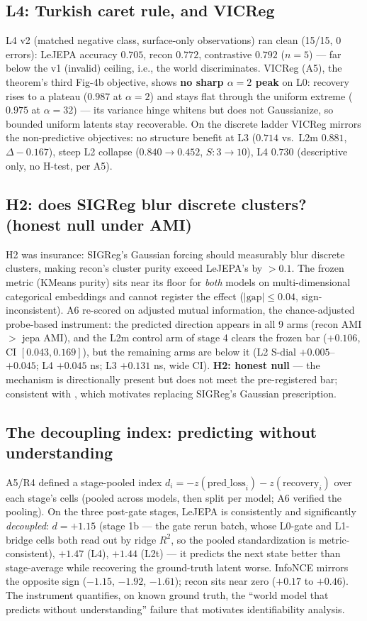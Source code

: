 \documentclass[11pt]{article}
\begin{document}
\subsection{L4: Turkish caret rule, and VICReg}
\label{sec:l4}
L4 v2 (matched negative class, surface-only observations) ran clean
(15/15, 0 errors): LeJEPA accuracy $0.705$, recon $0.772$, contrastive
$0.792$ ($n{=}5$) --- far below the v1 (invalid) ceiling, i.e., the world
discriminates. VICReg (A5), the theorem's third Fig-4b objective, shows
\textbf{no sharp $\alpha{=}2$ peak} on L0: recovery rises to a plateau
($0.987$ at $\alpha{=}2$) and stays flat through the uniform extreme ($0.975$
at $\alpha{=}32$) --- its variance hinge whitens but does not Gaussianize, so
bounded uniform latents stay recoverable. On the discrete ladder VICReg
mirrors the non-predictive objectives: no structure benefit at L3 ($0.714$ vs.\
L2m $0.881$, $\Delta{-}0.167$), steep L2 collapse ($0.840\to0.452$,
$S{:}3\to10$), L4 $0.730$ (descriptive only, no H-test, per A5).

\subsection{H2: does SIGReg blur discrete clusters? (honest null under AMI)}
\label{sec:h2}
H2 was insurance: SIGReg's Gaussian forcing should measurably blur discrete
clusters, making recon's cluster purity exceed LeJEPA's by $>0.1$. The frozen
metric (KMeans purity) sits near its floor for \emph{both} models on
multi-dimensional categorical embeddings and cannot register the effect
($|\text{gap}| \le 0.04$, sign-inconsistent). A6 re-scored on adjusted mutual
information, the chance-adjusted probe-based instrument: the predicted
direction appears in all 9 arms (recon AMI $>$ jepa AMI), and the L2m control
arm of stage 4 clears the frozen bar ($+0.106$, CI $[0.043,0.169]$), but the
remaining arms are below it (L2 S-dial $+0.005$--$+0.045$; L4 $+0.045$ ns; L3
$+0.131$ ns, wide CI). \textbf{H2: honest null} --- the mechanism is
directionally present but does not meet the pre-registered bar; consistent
with \citet{nogaussian2026}, which motivates replacing SIGReg's Gaussian
prescription.

\subsection{The decoupling index: predicting without understanding}
\label{sec:decoupling}
A5/R4 defined a stage-pooled index $d_i = -z(\text{pred\_loss}_i) -
z(\text{recovery}_i)$ over each stage's cells (pooled across models, then
split per model; A6 verified the pooling). On the three post-gate stages,
LeJEPA is consistently and significantly \emph{decoupled}:
$d = +1.15$ (stage 1b --- the gate rerun batch, whose L0-gate and L1-bridge
cells both read out by ridge $R^2$, so the pooled standardization is
metric-consistent), $+1.47$ (L4), $+1.44$ (L2t) --- it predicts the next
state better than stage-average while recovering the ground-truth latent worse.
InfoNCE mirrors the opposite sign ($-1.15$, $-1.92$, $-1.61$); recon sits near
zero ($+0.17$ to $+0.46$). The instrument quantifies, on known ground truth,
the ``world model that predicts without understanding'' failure that
motivates identifiability analysis.
\end{document}
